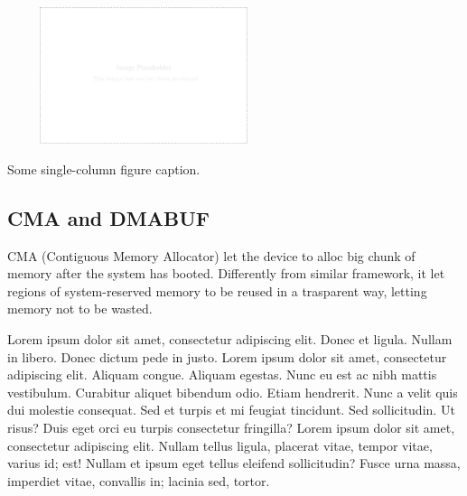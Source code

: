 \documentclass[a4paper,10pt]{article}
\makeatletter
\newenvironment{figurehere}{\def\@captype{figure}\vspace{2ex}}{\vspace{2ex}}
\makeatother
\begin{document}
\begin{multicols}{2}
%


\begin{figurehere}
 \centering
 \includegraphics[width=8cm, height=4cm]{./eps/placeholder.eps}
 \caption{Some single-column figure caption.}
 \label{fig:myfigure1}
\end{figurehere}


\subsection{CMA and DMABUF}

CMA (Contiguous Memory Allocator) let the device to alloc big chunk of memory 
after the system has booted.
Differently from similar framework, it let regions of system-reserved memory to 
be reused in a trasparent way, letting memory not to be wasted.

Lorem ipsum dolor sit amet, consectetur adipiscing elit. Donec et ligula. Nullam
in libero. Donec dictum pede in justo. Lorem ipsum dolor sit amet, consectetur
adipiscing elit. Aliquam congue. Aliquam egestas. Nunc eu est ac nibh mattis
vestibulum. Curabitur aliquet bibendum odio. Etiam hendrerit. Nunc a velit quis
dui molestie consequat. Sed et turpis et mi feugiat tincidunt. Sed sollicitudin.
Ut risus? Duis eget orci eu turpis consectetur fringilla? Lorem ipsum dolor sit
amet, consectetur adipiscing elit. Nullam tellus ligula, placerat vitae, tempor
vitae, varius id; est! Nullam et ipsum eget tellus eleifend sollicitudin? Fusce
urna massa, imperdiet vitae, convallis in; lacinia sed, tortor.


\end{multicols}
\end{document}
